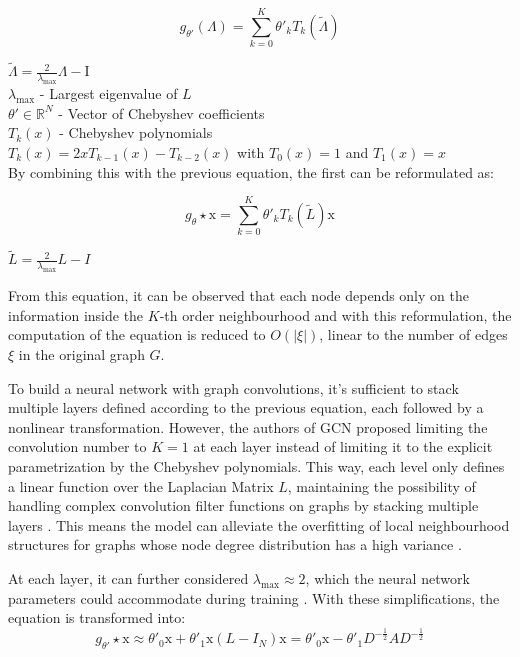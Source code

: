 \documentclass[11pt,a4paper]{article}
\begin{document}
\begin{equation}
g_{\theta'}(\Lambda) = \sum^K_{k=0} \theta'_k T_k(\tilde{\Lambda})    
\end{equation}
 
$\tilde{\Lambda} = \frac{2}{\lambda_\text{max}} \Lambda - \text{I}$  \\
$\lambda_\text{max}$ - Largest eigenvalue of $L$ \\
$\theta' \in \mathbb{R}^N$ - Vector of Chebyshev coefficients \\
$T_k(x)$ - Chebyshev polynomials \\
$T_k(x) = 2 x T_{k - 1} (x) - T_{k - 2}(x)$ with $T_0(x) = 1$ and $T_1(x) = x$ \\

By combining this with the previous equation, the first can be reformulated as:

\begin{equation}
g_\theta \star \text{x} = \sum^K_{k=0} \theta'_k T_k(\tilde{L}) \text{x}
\end{equation}
 
 $\tilde{L} = \frac{2}{\lambda_\text{max}} L - I$ 

From this equation, it can be observed that each node depends only on the information inside the $K$-th order neighbourhood and with this reformulation, the computation of the equation is reduced to $O(|\xi|)$, linear to the number of edges $\xi$ in the original graph $G$. \par

To build a neural network with graph convolutions, it's sufficient to stack multiple layers defined according to the previous equation, each followed by a nonlinear transformation. However, the authors of \ac{GCN} \cite{kipfSemiSupervisedClassificationGraph2017} proposed limiting the convolution number to $K = 1$ at each layer instead of limiting it to the explicit parametrization by the Chebyshev polynomials. This way, each level only defines a linear function over the Laplacian Matrix $L$, maintaining the possibility of handling complex convolution filter functions on graphs by stacking multiple layers \cite{kipfSemiSupervisedClassificationGraph2017, tangGraphNeuralNetworks2022}. This means the model can alleviate the overfitting of local neighbourhood structures for graphs whose node degree distribution has a high variance \cite{kipfSemiSupervisedClassificationGraph2017, tangGraphNeuralNetworks2022}.

At each layer, it can further considered $\lambda_\text{max} \approx 2$, which the neural network parameters could accommodate during training \cite{tangGraphNeuralNetworks2022}. With these simplifications, the equation is transformed into:
\begin{equation}
g_{\theta'} \star \text{x} \approx \theta'_0 \text{x} + \theta'_1 \text{x} (L - I_N) \text{x} = \theta'_0 \text{x} - \theta'_1 D^{-\frac{1}{2}} AD^{-\frac{1}{2}}
\end{equation}
 
\end{document}
